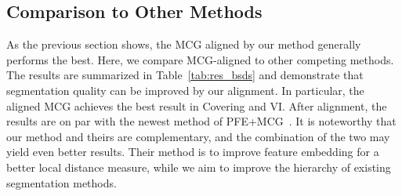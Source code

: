 \subsection{Comparison to Other Methods}
As the previous section shows, the MCG aligned by our method generally
performs the best. Here, we compare MCG-aligned to other competing
methods. The results are summarized in Table~\ref{tab:res_bsds} and
demonstrate that segmentation quality can be improved by our
alignment. In particular, the aligned MCG achieves the best result in
Covering and VI. After alignment, the results are on
par with the newest method of PFE+MCG~\cite{yupiecewise}. It is
noteworthy that our method and theirs are complementary, and the
combination of the two may yield even better results. Their method is
to improve feature embedding for a better local distance measure,
while we aim to improve the hierarchy of existing segmentation methods. 

\begin{table}
\begin{center}
\end{center}
\caption{Segmentation results on BSDS500 test set, with a comparison to the state-of-the-art competitors.}
\label{tab:res_bsds}
\end{table}


